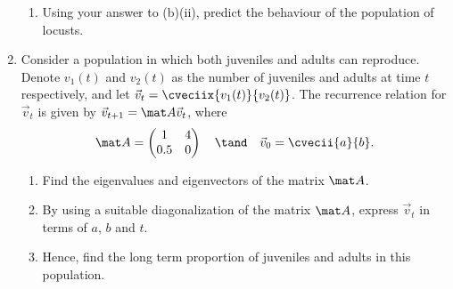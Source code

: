 \begin{problem}
\begin{enumerate}
\begin{enumerate}
            \item Using your answer to (b)(ii), predict the behaviour of the population of locusts.
        \end{enumerate}
        \item Consider a population in which both juveniles and adults can reproduce. Denote $v_1(t)$ and $v_2(t)$ as the number of juveniles and adults at time $t$ respectively, and let $\vec v_t = \cveciix{v_1(t)}{v_2(t)}$. The recurrence relation for $\vec v_t$ is given by $\vec v_{t+1} = \mat A \vec v_t$, where \[\mat A = \begin{pmatrix}1 & 4 \\ 0.5 & 0\end{pmatrix} \quad \tand \quad \vec v_0 = \cvecii{a}{b}.\]
        \begin{enumerate}
            \item Find the eigenvalues and eigenvectors of the matrix $\mat A$.
            \item By using a suitable diagonalization of the matrix $\mat A$, express $\vec v_t$ in terms of $a$, $b$ and $t$.
            \item Hence, find the long term proportion of juveniles and adults in this population.
        \end{enumerate}
    \end{enumerate}
\end{problem}
